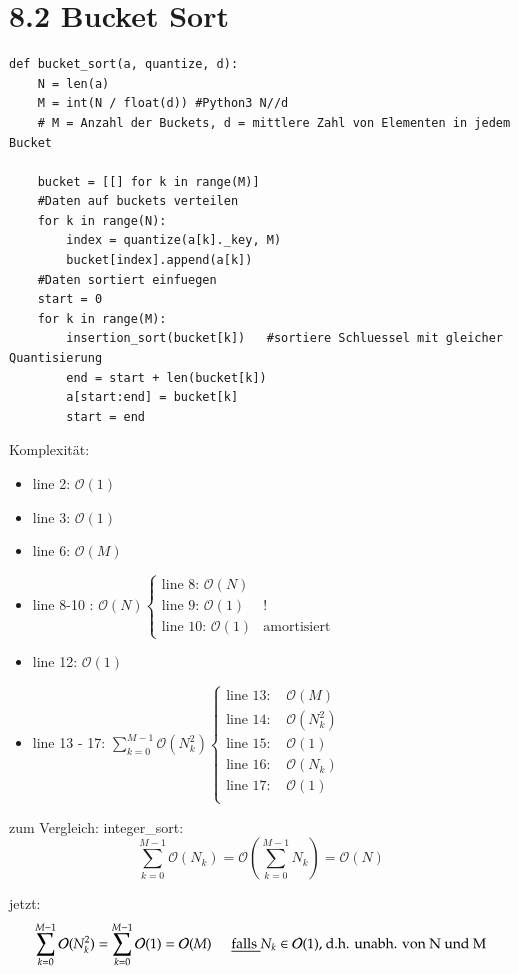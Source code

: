 \documentclass[11pt, fleqn]{scrreprt}
\newcommand{\bigO}[0]{\mathcal{O}}
\begin{document}
\section*{8.2 Bucket Sort}

\begin{verbatim}
def bucket_sort(a, quantize, d):
    N = len(a)
    M = int(N / float(d)) #Python3 N//d
    # M = Anzahl der Buckets, d = mittlere Zahl von Elementen in jedem Bucket

    bucket = [[] for k in range(M)]
    #Daten auf buckets verteilen
    for k in range(N):
        index = quantize(a[k]._key, M)
        bucket[index].append(a[k])
    #Daten sortiert einfuegen
    start = 0
    for k in range(M):
        insertion_sort(bucket[k])   #sortiere Schluessel mit gleicher Quantisierung
        end = start + len(bucket[k])
        a[start:end] = bucket[k]
        start = end
\end{verbatim}
Komplexität:
\begin{itemize}
    \item line 2: $\bigO{}(1)$
    \item line 3: $\bigO{}(1)$
    \item line 6: $\bigO{}(M)$
    \item line 8-10 : $\bigO{}(N) \begin{cases}\text{line 8: } \bigO{}(N) & \\ \text{line 9: } \bigO{}(1) & ! \\ \text{line 10: }  \bigO{}(1) & \text{amortisiert}\end{cases}$
    \item line 12: $\bigO{}(1)$
    \item line 13 - 17: $\sum_{k=0}^{M-1} \bigO{}(N_k^2) \begin{cases} \text{line 13: } & \bigO{}(M) \\ \text{line 14: } & \bigO{}(N_k^2) \\  \text{line 15: } & \bigO{}(1)  \\\text{line 16: } & \bigO{}(N_k) \\  \text{line 17: } & \bigO{}(1) \\ \end{cases}$
\end{itemize}
zum Vergleich: integer\_sort:
\[ \sum_{k=0}^{M-1} \bigO{}(N_k) = \bigO{}\left( \sum_{k=0}^{M-1} N_k\right) = \bigO{}(N)\]

jetzt:
\[ \sum_{k=0}^{M-1} \bigO{}(N_k^2) = \sum_{k=0}^{M-1} \bigO{}(1) = \bigO{}(M) \hspace*{0.5cm} \underline{\text{falls }} N_k \in \bigO{}(1) \text{, d.h. unabh. von N und M} \]
\end{document}
